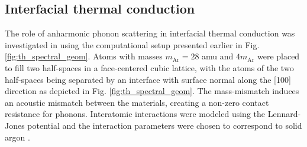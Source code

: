 \subsection{Interfacial thermal conduction}
\label{sec:results_interface}

The role of anharmonic phonon scattering in interfacial thermal conduction was investigated in  using the computational setup presented earlier in Fig. \ref{fig:th_spectral_geom}. Atoms with masses $m_{\textrm{Ar}}=28$ amu and $4m_{\textrm{Ar}}$ were placed to fill two half-spaces in a face-centered cubic lattice, with the atoms of the two half-spaces being separated by an interface with surface normal along the [100] direction as depicted in Fig. \ref{fig:th_spectral_geom}. The mass-mismatch induces an acoustic mismatch between the materials, creating a non-zero contact resistance for phonons. Interatomic interactions were modeled using the Lennard-Jones potential \cite{allentildesley} and the interaction parameters were chosen to correspond to solid argon \cite{allentildesley}. %


